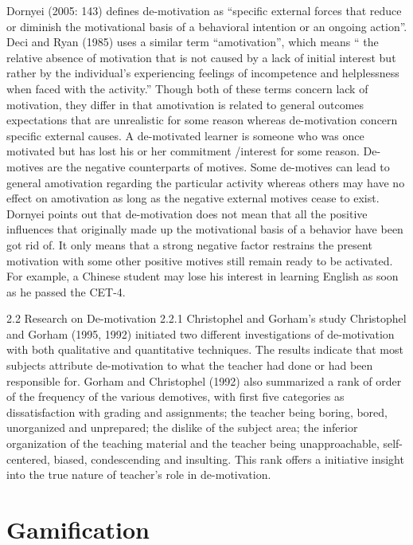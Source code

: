 Dornyei (2005: 143) defines de-motivation as “specific external forces that reduce or diminish the motivational basis of a behavioral intention or an ongoing action”. Deci and Ryan (1985) uses a similar term “amotivation”, which means “ the relative absence of motivation that is not caused by a lack of initial interest but rather by the individual’s experiencing feelings of incompetence and helplessness when faced with the activity.” Though both of these terms concern lack of motivation, they differ in that amotivation is related to general outcomes expectations that are unrealistic for some reason whereas de-motivation concern specific external causes. A de-motivated learner is someone who was once motivated but has lost his or her commitment /interest for some reason. De-motives are the negative counterparts of motives. Some de-motives can lead to general amotivation regarding the particular activity whereas others may have no effect on amotivation as long as the negative external motives cease to exist. Dornyei points out that de-motivation does not mean that all the positive influences that originally made up the motivational basis of a behavior have been got rid of. It only means that a strong negative factor restrains the present motivation with some other positive motives still remain ready to be activated. For example, a Chinese student may lose his interest in learning English as soon as he passed the CET-4.

2.2 Research on De-motivation
2.2.1 Christophel and Gorham’s study
Christophel and Gorham (1995, 1992) initiated two different investigations of de-motivation with both qualitative and quantitative techniques. The results indicate that most subjects attribute de-motivation to what the teacher had done or had been responsible for. Gorham and Christophel (1992) also summarized a rank of order of the frequency of the various demotives, with first five categories as dissatisfaction with grading and assignments; the teacher being boring, bored, unorganized and unprepared; the dislike of the subject area; the inferior organization of the teaching material and the teacher being unapproachable, self-centered, biased, condescending and insulting. This rank offers a initiative insight into the true nature of teacher’s role in de-motivation.

\section{Gamification}
\label{sec:gamification}

